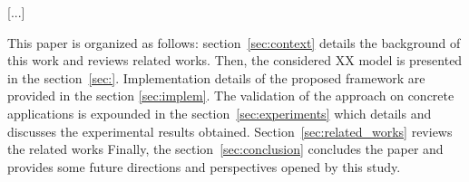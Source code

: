 
[...]


This paper is organized as follows:
section~\ref{sec:context} details the background of this work and reviews
related works.
Then, the considered XX model is presented in the section~\ref{sec:}.
Implementation details of the proposed framework are provided in the section
\ref{sec:implem}.
The validation of the approach on concrete applications is expounded in the
section~\ref{sec:experiments} which details and discusses the experimental
results obtained.
Section~\ref{sec:related_works} reviews the related works  
Finally, the section~\ref{sec:conclusion} concludes the paper and provides some
future directions and perspectives opened by this study. 









%
